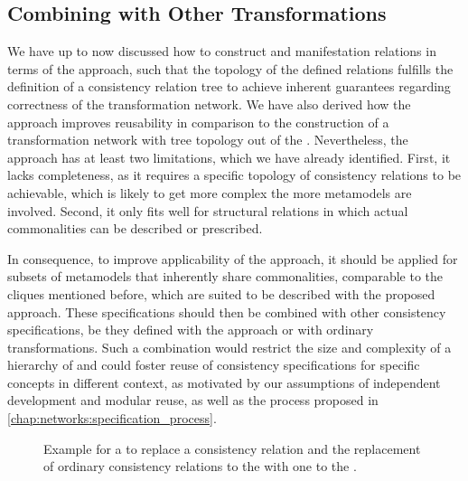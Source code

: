 

\subsection{Combining with Other Transformations}

We have up to now discussed how to construct \conceptmetamodels and manifestation relations in terms of the \commonalities approach, such that the topology of the defined relations fulfills the definition of a consistency relation tree to achieve inherent guarantees regarding correctness of the transformation network.
We have also derived how the \commonalities approach improves reusability in comparison to the construction of a transformation network with tree topology out of the \concretemetamodels.
Nevertheless, the approach has at least two limitations, which we have already identified.
First, it lacks completeness, as it requires a specific topology of consistency relations to be achievable, which is likely to get more complex the more metamodels are involved.
Second, it only fits well for structural relations in which actual commonalities can be described or prescribed.

In consequence, to improve applicability of the approach, it should be applied for subsets of metamodels that inherently share commonalities, comparable to the cliques mentioned before, which are suited to be described with the proposed approach.
These specifications should then be combined with other consistency specifications, be they defined with the \commonalities approach or with ordinary transformations.
Such a combination would restrict the size and complexity of a hierarchy of \commonalities and could foster reuse of consistency specifications for specific concepts in different context, as motivated by our assumptions of independent development and modular reuse, as well as the process proposed in \autoref{chap:networks:specification_process}.

\begin{figure}
    \centering
    
    \caption[Partial transformation network of \commonalities]{Example for a \conceptmetamodel to replace a consistency relation and the replacement of ordinary consistency relations to the \concretemetamodels with one to the \conceptmetamodel.}
    \label{fig:improvement:commonalities_combination_generic}
\end{figure}

